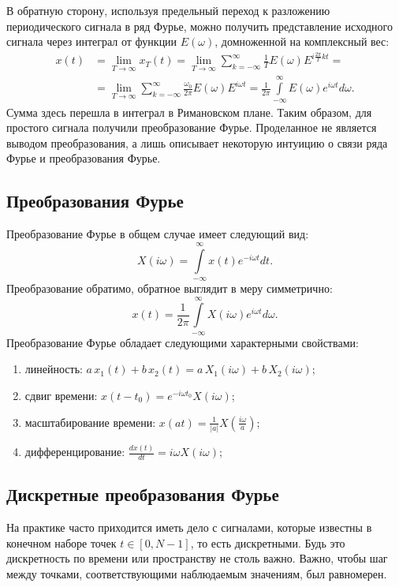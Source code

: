 В обратную сторону, используя предельный переход к разложению периодического сигнала в ряд Фурье, можно получить представление исходного сигнала через интеграл от функции $E(\omega)$, домноженной на комплексный вес:
\begin{align*} 
x(t) & = \lim \limits _{T \to \infty} x_T(t) = \lim \limits _{T \to \infty} \sum \limits_{k=-\infty}^{\infty} \frac{1}{T} E(\omega) E^{i \frac{2 \pi}{T}kt} = \\
& =  \lim \limits _{T \to \infty} \sum \limits_{k=-\infty}^{\infty} \frac{\omega_0}{2 \pi} E(\omega) E^{i \omega t} = \frac{1}{2 \pi} \int \limits_{-\infty}^{\infty} E(\omega) e^{i \omega t} d \omega.
\end{align*}
Сумма здесь перешла в интеграл в Римановском плане. Таким образом, для простого сигнала получили преобразование Фурье. Проделанное не является выводом преобразования, а лишь описывает некоторую интуицию о связи ряда Фурье и преобразования Фурье.

\subsection{Преобразования Фурье}

Преобразование Фурье в общем случае имеет следующий вид:
$$X(i \omega) = \int \limits_{-\infty}^{\infty} x(t) e^{-i\omega t} dt.$$
Преобразование обратимо, обратное выглядит в меру симметрично:
$$x(t) = \frac{1}{2\pi} \int \limits_{-\infty}^{\infty} X(i \omega) e^{i \omega t} d\omega.$$
Преобразование Фурье обладает следующими характерными свойствами:
\begin{enumerate}
\item линейность: $a \, x_1(t) + b \, x_2(t) = a\,X_1(i \omega) + b\,X_2(i \omega)$;
\item сдвиг времени: $x(t - t_0) = e^{- i \omega t_0} X(i \omega)$;
\item масштабирование времени: $x(at) = \frac{1}{|a|}X(\frac{i \omega}{a})$;
\item дифференцирование: $\frac{dx(t)}{dt} = i \omega X(i \omega)$;
\end{enumerate}

\subsection{Дискретные преобразования Фурье}

На практике часто приходится иметь дело с сигналами, которые известны в конечном наборе точек $t \in [0, N-1]$, то есть дискретными. Будь это дискретность по времени или пространству не столь важно. Важно, чтобы шаг между точками, соответствующими наблюдаемым значениям, был равномерен.

